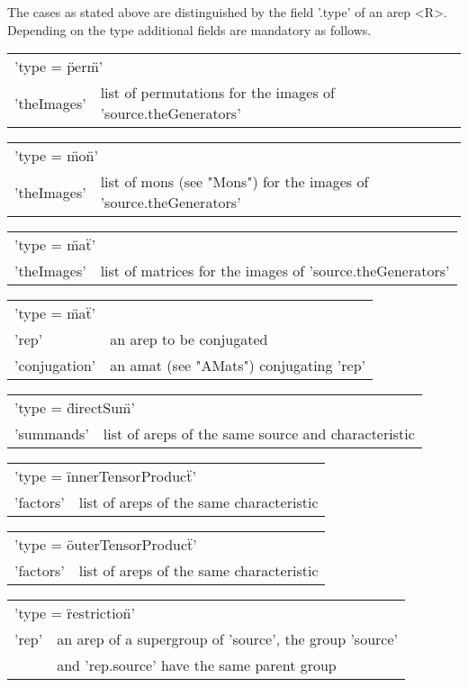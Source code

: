 The cases as stated above are distinguished by the field '.type'
of an arep <R>. Depending on the type additional fields are mandatory
as follows.

\bigskip
\begin{tabular}{p{2.5cm}p{10cm}}
\multicolumn{2}{l}{'type = \"perm\"\:'}\\
'theImages'    & list of permutations for the images 
of 'source.theGenerators'
\end{tabular}

\begin{tabular}{p{2.5cm}p{10cm}}
\multicolumn{2}{l}{'type = \"mon\"\:'}\\
'theImages'    & list of mons (see "Mons") for the images 
of 'source.theGenerators'
\end{tabular}

\begin{tabular}{p{2.5cm}p{10cm}}
\multicolumn{2}{l}{'type = \"mat\"\:'}\\
'theImages'    & list of matrices for the images 
of 'source.theGenerators'
\end{tabular}

\begin{tabular}{p{2.5cm}p{10cm}}
\multicolumn{2}{l}{'type = \"mat\"\:'}\\
'rep' & an arep to be conjugated\\
'conjugation' & an amat (see "AMats") conjugating 'rep'
\end{tabular}

\begin{tabular}{p{2.5cm}p{10cm}}
\multicolumn{2}{l}{'type = \"directSum\"\:'}\\
'summands'    & list of areps of the same source and characteristic
\end{tabular}

\begin{tabular}{p{2.5cm}p{10cm}}
\multicolumn{2}{l}{'type = \"innerTensorProduct\"\:'}\\
'factors'    & list of areps of the same characteristic
\end{tabular}

\begin{tabular}{p{2.5cm}p{10cm}}
\multicolumn{2}{l}{'type = \"outerTensorProduct\"\:'}\\
'factors'    & list of areps of the same characteristic
\end{tabular}

\begin{tabular}{p{2.5cm}p{10cm}}
\multicolumn{2}{l}{'type = \"restriction\"\:'}\\
'rep'    & an arep of a supergroup of 'source', the group 'source'\\
 & and 'rep.source' have the same parent group
\end{tabular}

